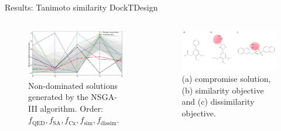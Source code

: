 \documentclass[aspectratio=169,xcolor=dvipsnames]{beamer}
\begin{document}
\begin{frame}{Results: Tanimoto similarity \hfill {\footnotesize \alert{DockTDesign}}}
    \begin{columns}[c]
        \begin{figure}[ht!]
            \centering
            \includegraphics[width=1\textwidth]{imgs/results/parallel-coords.png}
            \caption{Non-dominated solutions generated by the NSGA-III algorithm. Order: $f_{\text{QED}},  f_{\text{SA}}, f_{\text{Cx}},  f_{\text{sim}}, f_{\text{dissim}}$.}
        \end{figure}

        \begin{figure}[ht!]
            \centering
            \includegraphics[width=1\textwidth]{imgs/results/compromise-molecule.png}
            \caption{(a) compromise solution, (b) similarity objective and (c) dissimilarity objective.}
        \end{figure}
    \end{columns}

\end{frame}
\end{document}
